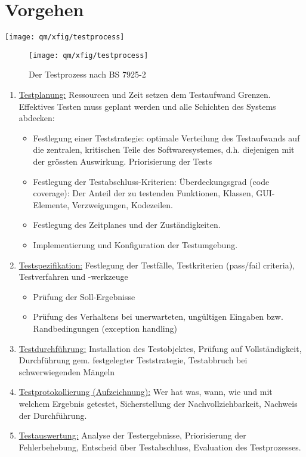 \section{Vorgehen}
%
\ifslides
\texttt{[image: qm/xfig/testprocess]}\\
\newslide
\else
\begin{figure}[H]
\begin{center}
\texttt{[image: qm/xfig/testprocess]}\\
\end{center}
\caption{Der Testprozess nach BS 7925-2}
\end{figure}
\fi
%
\begin{enumerate}
\item \underline{Testplanung:}
Ressourcen und Zeit setzen dem Testaufwand Grenzen. Effektives Testen
muss geplant werden und alle Schichten des Systems abdecken:
\begin{itemize}
\item Festlegung einer Teststrategie: optimale Verteilung des Testaufwands auf
  die zentralen, kritischen Teile des Softwaresystemes,
  d.h. diejenigen mit der grössten Auswirkung. Priorisierung der Tests
\item Festlegung der Testabschluss-Kriterien: Überdeckungsgrad (code
  coverage): Der Anteil der zu
  testenden Funktionen, Klassen, GUI-Elemente, Verzweigungen, Kodezeilen.
\item Festlegung des Zeitplanes und der Zuständigkeiten.
\item Implementierung und Konfiguration der Testumgebung.
\end{itemize}
\ifslides
\newpage
\fi
\item \underline{Testspezifikation:} Festlegung der Testfälle, Testkriterien (pass/fail
  criteria), Testverfahren und -werkzeuge
  \begin{itemize}
  \item Prüfung der Soll-Ergebnisse
  \item Prüfung des Verhaltens bei unerwarteten, ungültigen Eingaben
  bzw. Randbedingungen (exception handling)
  \end{itemize}
\item \underline{Testdurchführung:}
  Installation des Testobjektes, Prüfung auf Vollständigkeit, Durchführung
  gem. festgelegter Teststrategie, Testabbruch bei schwerwiegenden Mängeln
\ifslides
\newpage
\fi
\item \underline{Testprotokollierung (Aufzeichnung):} Wer hat was, wann, wie und mit
  welchem Ergebnis getestet, Sicherstellung der Nachvollziehbarkeit, Nachweis
  der Durchführung.
\item \underline{Testauswertung:} Analyse der Testergebnisse, Priorisierung der
  Fehlerbehebung, Entscheid über Testabschluss, Evaluation des Testprozesses.
\end{enumerate}
%
\newpage
